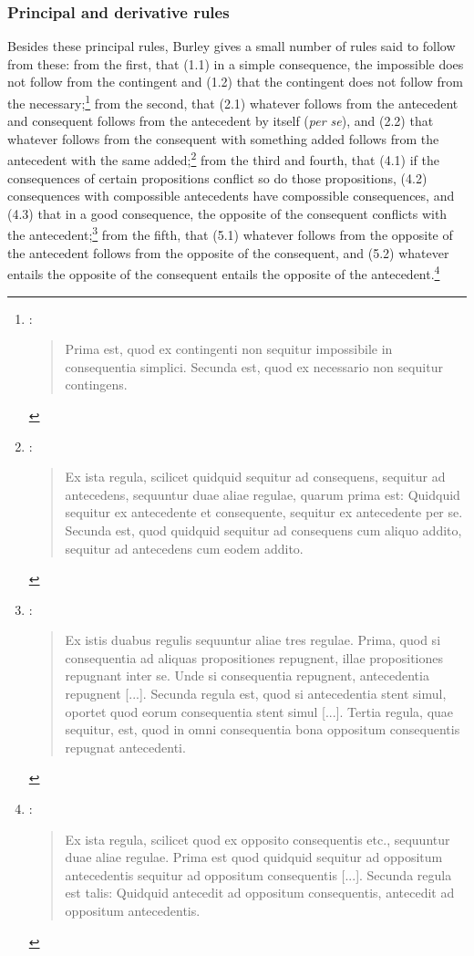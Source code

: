 \documentclass[]{birkjour}
\begin{document}
\subsubsection{Principal and derivative rules}
Besides these principal rules, Burley gives a small number of rules said to follow from these: from the first, that (1.1) in a simple consequence, the impossible does not follow from the contingent and (1.2) that the contingent does not follow from the necessary;\footnote{\autocite[p. 62.1-8]{BurleyDPAL}: \begin{quote}
		Prima est, quod ex contingenti non sequitur impossibile in consequentia simplici. Secunda est, quod ex necessario non sequitur contingens.
	\end{quote}} from the second, that (2.1) whatever follows from the antecedent and consequent follows from the antecedent by itself (\textit{per se}), and (2.2) that whatever follows from the consequent with something added follows from the antecedent with the same added;\footnote{\autocite[p. 62.20-26]{BurleyDPAL}: \begin{quote}
	Ex ista regula, scilicet quidquid sequitur ad consequens, sequitur ad antecedens, sequuntur duae aliae regulae, quarum prima est: Quidquid sequitur ex antecedente et consequente, sequitur ex antecedente per se. Secunda est, quod quidquid sequitur ad consequens cum aliquo addito, sequitur ad antecedens cum eodem addito.
\end{quote}} from the third and fourth, that (4.1) if the consequences of certain propositions conflict so do those propositions, (4.2) consequences with compossible antecedents have compossible consequences, and (4.3) that in a good consequence, the opposite of the consequent conflicts with the antecedent;\footnote{\autocite[pp. 63.15-32]{BurleyDPAL}: \begin{quote}
Ex istis duabus regulis sequuntur aliae tres regulae. Prima, quod si consequentia ad aliquas propositiones repugnent, illae propositiones repugnant inter se. Unde si consequentia repugnent, antecedentia repugnent [...]. Secunda regula est, quod si antecedentia stent simul, oportet quod eorum consequentia stent simul [...]. Tertia regula, quae sequitur, est, quod in omni consequentia bona oppositum consequentis repugnat antecedenti.
\end{quote}} from the fifth, that (5.1) whatever follows from the opposite of the antecedent follows from the opposite of the consequent, and (5.2) whatever entails the opposite of the consequent entails the opposite of the antecedent.\footnote{\autocite[65.18-21, 31-32]{BurleyDPAL}: \begin{quote}
Ex ista regula, scilicet quod ex opposito consequentis etc., sequuntur duae aliae regulae. Prima est quod quidquid sequitur ad oppositum antecedentis sequitur ad oppositum consequentis [...]. Secunda regula est talis: Quidquid antecedit ad oppositum consequentis, antecedit ad oppositum antecedentis.
\end{quote}}
\end{document}
